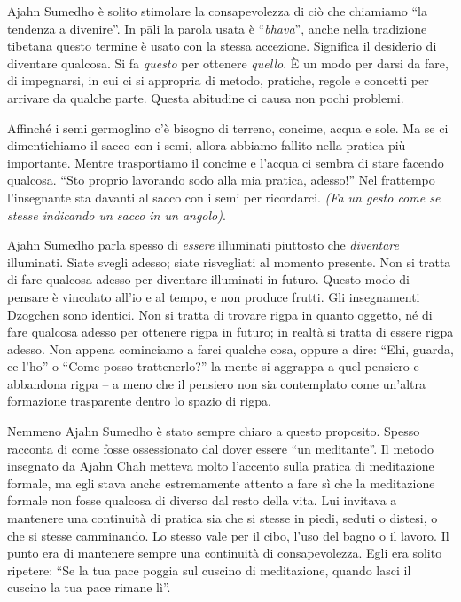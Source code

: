 Ajahn Sumedho è solito stimolare la consapevolezza di ciò che chiamiamo ``la tendenza a divenire''. In pāli la parola usata è ``\textit{bhava}'', anche nella tradizione tibetana questo termine è usato con la stessa accezione. Significa il desiderio di diventare qualcosa. Si fa \textit{questo} per ottenere \textit{quello}. È un modo per darsi da fare, di impegnarsi, in cui ci si appropria di metodo, pratiche, regole e concetti per arrivare da qualche parte. Questa abitudine ci causa non pochi problemi. 

Affinché i semi germoglino c'è bisogno di terreno, concime, acqua e sole. Ma se ci dimentichiamo il sacco con i semi, allora abbiamo fallito nella pratica più importante. Mentre trasportiamo il concime e l'acqua ci sembra di stare facendo qualcosa. ``Sto proprio lavorando sodo alla mia pratica, adesso!'' Nel frattempo l'insegnante sta davanti al sacco con i semi per ricordarci. \textit{(Fa un gesto come se stesse indicando un sacco in un angolo)}.

Ajahn Sumedho parla spesso di \textit{essere} illuminati piuttosto che \textit{diventare} illuminati. Siate svegli adesso; siate risvegliati al momento presente. Non si tratta di fare qualcosa adesso per diventare illuminati in futuro. Questo modo di pensare è vincolato all'io e al tempo, e non produce frutti. Gli insegnamenti Dzogchen sono identici. Non si tratta di trovare rigpa in quanto oggetto, né di fare qualcosa adesso per ottenere rigpa in futuro; in realtà si tratta di essere rigpa adesso. Non appena cominciamo a farci qualche cosa, oppure a dire: ``Ehi, guarda, ce l'ho'' o ``Come posso trattenerlo?'' la mente si aggrappa a quel pensiero e abbandona rigpa -- a meno che il pensiero non sia contemplato come un'altra formazione trasparente dentro lo spazio di rigpa.

Nemmeno Ajahn Sumedho è stato sempre chiaro a questo proposito. Spesso racconta di come fosse ossessionato dal dover essere ``un meditante''. Il metodo insegnato da Ajahn Chah metteva molto l'accento sulla pratica di meditazione formale, ma egli stava anche estremamente attento a fare sì che la meditazione formale non fosse qualcosa di diverso dal resto della vita. Lui invitava a mantenere una continuità di pratica sia che si stesse in piedi, seduti o distesi, o che si stesse camminando. Lo stesso vale per il cibo, l'uso del bagno o il lavoro. Il punto era di mantenere sempre una continuità di consapevolezza. Egli era solito ripetere: ``Se la tua pace poggia sul cuscino di meditazione, quando lasci il cuscino la tua pace rimane lì''.

